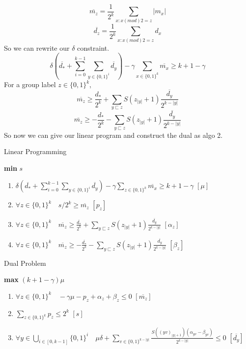 \documentclass[twoside,11pt]{homework}
\begin{document}
\begin{enumerate}
    $$\overline{m_{z}} = \frac{1}{2^{k}} \sum\limits_{x:x(mod)2 = z}|m_{x}|$$
    $$\overline{d_{z}} = \frac{1}{2^{k}}\sum\limits_{x:x(mod)2 = z} d_{x}$$
    So we can rewrite our $\delta$ constraint.
    $$\delta (\overline{d_{*}} + \sum\limits_{i=0}^{k-1}\sum\limits_{y \in \{0,1\}^{i}}\overline{d_y}) - \gamma \sum\limits_{x \in \{0,1\}^{k}} \overline{m_x} \geq k+1-\gamma$$
    For a group label $z \in \{0,1\}^k$,
    $$\overline{m_z}\geq \frac{d_{*}}{2^{k}} + \sum\limits_{y \sqsubset z} S(z_{|y|}+1)\frac{\overline{d_{y}}}{2^{k-|y|}}$$
    $$\overline{m_z}\geq -\frac{d_{*}}{2^{k}} - \sum\limits_{y \sqsubset z} S(z_{|y|}+1)\frac{\overline{d_{y}}}{2^{k-|y|}}$$
    So now we can give our linear program and construct the dual as algo 2.\\
    \begin{center}
    \begin{algorithm}[H]
    \caption{Linear Programming}
    \textbf{min} $s$
    \begin{enumerate}
      \item $\delta (\overline{d_{*}} + \sum\limits_{i=0}^{k-1}\sum\limits_{y \in \{0,1\}^{i}}\overline{d_y}) - \gamma \sum\limits_{z \in \{0,1\}^{k}} \overline{m_x} \geq k+1-\gamma$   $[\mu]$
      \item $\forall z \in \{0,1\}^{k} \quad s/2^{k} \geq \overline{m_{z}}$   $[p_{z}]$
      \item $\forall z \in \{0,1\}^{k} \quad \overline{m_{z}} \geq \frac{\overline{d_{*}}}{2^{k}} + \sum\limits_{y \sqsubset z} S(z_{|y|}+1)\frac{\overline{d_y}}{2^{k-|y|}}$   $[\alpha_{z}]$
      \item $\forall z \in \{0,1\}^{k} \quad \overline{m_{z}} \geq -\frac{\overline{d_{*}}}{2^{k}} - \sum\limits_{y \sqsubset z} S(z_{|y|}+1)\frac{\overline{d_{y}}}{2^{k-|y|}}$   $[\beta_{z}]$
    \end{enumerate}
    \end{algorithm}
    \end{center}
    \begin{center}
    \begin{algorithm}[H]
    \caption{Dual Problem}
    \textbf{max} $(k+1-\gamma)\mu$
    \begin{enumerate}
      \item $\forall z \in \{0,1\}^{k} \quad -\gamma \mu - p_z+\alpha_z+\beta_z\leq 0$   $[\overline{m_{z}}]$ 
      \item $\sum\limits_{z \in \{0,1\}^{k}}p_{z} \leq 2^{k}$   $[s]$ 
      \item $\forall y \in \bigcup_{i \in [0,k-1]}\{0,1\}^{i} \quad \mu\delta +\sum\limits_{v \in \{0,1\}^{k-|y|}}\frac{S((yv)_{|y|+1})(\alpha_{yv}-\beta_{yv})}{2^{k-|y|}} \leq 0$   $[\overline{d_{y}}]$ 

\end{enumerate}
\end{algorithm}
\end{center}
\end{enumerate}
\end{document}
